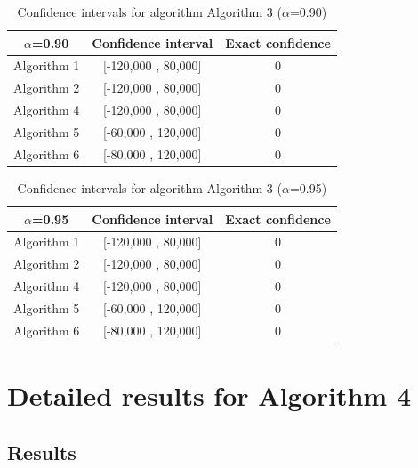 \documentclass[a4paper,10pt]{article}
\begin{document}
\begin{table}[!htp]
\centering\small
\begin{tabular}{
|c|c|c|}
\hline
 $\alpha$=0.90 & Confidence interval & Exact confidence \\ \hline 
Algorithm 1 & [-120,000 , 80,000] & 0\\ \hline 
Algorithm 2 & [-120,000 , 80,000] & 0\\ \hline 
Algorithm 4 & [-120,000 , 80,000] & 0\\ \hline 
Algorithm 5 & [-60,000 , 120,000] & 0\\ \hline 
Algorithm 6 & [-80,000 , 120,000] & 0\\ \hline 

\end{tabular}
\caption{Confidence intervals for algorithm Algorithm 3 ($\alpha$=0.90)}
\end{table}
\begin{table}[!htp]
\centering\small
\begin{tabular}{
|c|c|c|}
\hline
 $\alpha$=0.95 & Confidence interval & Exact confidence \\ \hline 
Algorithm 1 & [-120,000 , 80,000] & 0\\ \hline 
Algorithm 2 & [-120,000 , 80,000] & 0\\ \hline 
Algorithm 4 & [-120,000 , 80,000] & 0\\ \hline 
Algorithm 5 & [-60,000 , 120,000] & 0\\ \hline 
Algorithm 6 & [-80,000 , 120,000] & 0\\ \hline 

\end{tabular}
\caption{Confidence intervals for algorithm Algorithm 3 ($\alpha$=0.95)}
\end{table}

 \clearpage 


\section{Detailed results for Algorithm 4}


\subsection{Results}
\end{document}
